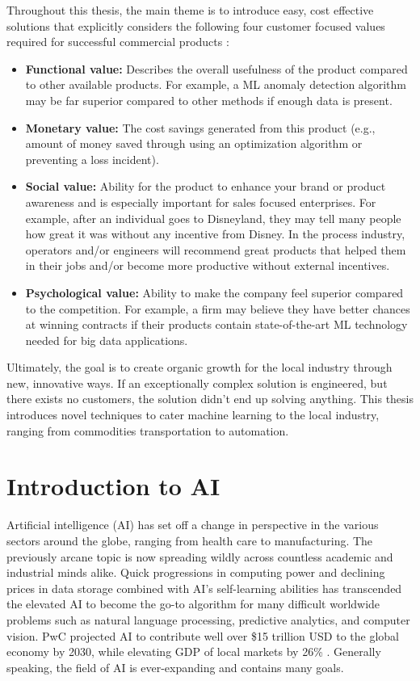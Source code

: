 Throughout this thesis, the main theme is to introduce easy, cost effective solutions that explicitly considers the following four customer focused values required for successful commercial products \cite{marketing}:
\begin{itemize}
    \item \textbf{Functional value:} Describes the overall usefulness of the product compared to other available products.  For example, a ML anomaly detection algorithm may be far superior compared to other methods if enough data is present.
    \item \textbf{Monetary value:} The cost savings generated from this product (e.g., amount of money saved through using an optimization algorithm or preventing a loss incident).  
    \item \textbf{Social value:} Ability for the product to enhance your brand or product awareness and is especially important for sales focused enterprises.  For example, after an individual goes to Disneyland, they may tell many people how great it was without any incentive from Disney.  In the process industry, operators and/or engineers will recommend great products that helped them in their jobs and/or become more productive without external incentives.
    \item \textbf{Psychological value:} Ability to make the company feel superior compared to the competition.  For example, a firm may believe they have better chances at winning contracts if their products contain state-of-the-art ML technology needed for big data applications.
\end{itemize}
Ultimately, the goal is to create organic growth for the local industry through new, innovative ways.  If an exceptionally complex solution is engineered, but there exists no customers, the solution didn't end up solving anything. This thesis introduces novel techniques to cater machine learning to the local industry, ranging from commodities transportation to automation.

\section{Introduction to AI}
Artificial intelligence (AI) has set off a change in perspective in the various sectors around the globe, ranging from health care to manufacturing.  The previously arcane topic is now spreading wildly across countless academic and industrial minds alike. Quick progressions in computing power and declining prices in data storage combined with AI's self-learning abilities has transcended the elevated AI to become the go-to algorithm for many difficult worldwide problems such as natural language processing, predictive analytics, and computer vision.  PwC projected AI to contribute well over \$15 trillion USD to the global economy by 2030, while elevating GDP of local markets by 26\%  \cite{pwc}. Generally speaking, the field of AI is ever-expanding and contains many goals.


